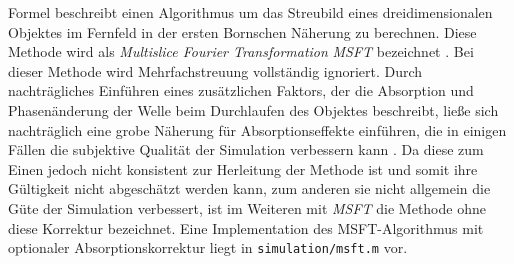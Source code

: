 Formel  beschreibt einen Algorithmus um das Streubild eines dreidimensionalen Objektes im Fernfeld in der ersten Bornschen Näherung zu berechnen. Diese Methode wird als \textit{Multislice Fourier Transformation} \textit{MSFT} bezeichnet \cite{barke2015}. 
Bei dieser Methode wird Mehrfachstreuung vollständig ignoriert. Durch nachträgliches Einführen eines zusätzlichen Faktors, der die Absorption und Phasenänderung der Welle beim Durchlaufen des Objektes beschreibt, ließe sich nachträglich eine grobe Näherung für Absorptionseffekte einführen, die in einigen Fällen die subjektive Qualität der Simulation verbessern kann \cite{barke2015}. Da diese zum Einen jedoch nicht konsistent zur Herleitung der Methode ist und somit ihre Gültigkeit nicht abgeschätzt werden kann, zum anderen sie nicht allgemein die Güte der Simulation verbessert, ist im Weiteren mit \textit{MSFT} die Methode ohne diese Korrektur bezeichnet.
Eine Implementation des MSFT-Algorithmus mit optionaler Absorptionskorrektur liegt in \texttt{simulation/msft.m} vor. 

